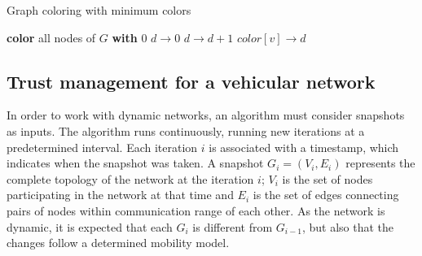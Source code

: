 \documentclass[conference]{IEEEtran}
\begin{document}
\begin{algorithm}
\caption{Graph coloring with minimum colors}\label{algorithm:coloring}
\begin{algorithmic}[1]


\State \textbf{color} all nodes of $G$ \textbf{with} 0
\State $d \rightarrow 0$
			\State $d \rightarrow d+1$
		\EndIf
		\State $color[v] \rightarrow d$
	\EndIf
\EndFor


\EndFunction
\end{algorithmic}
\end{algorithm}

\subsection{Trust management for a vehicular network}
\label{section:trustmanagement}


In order to work with dynamic networks, an algorithm must consider snapshots as inputs.
The algorithm runs continuously, running new iterations at a predetermined interval.
Each iteration $i$ is associated with a timestamp, which indicates when the snapshot was taken.
A snapshot $G_i = (V_i, E_i)$ represents the complete topology of the network at the iteration $i$; $V_i$ is the set of nodes participating in the network at that time and $E_i$ is the set of edges connecting pairs of nodes within communication range of each other.
As the network is dynamic, it is expected that each $G_i$ is different from $G_{i-1}$, but also that the changes follow a determined mobility model.
\end{document}
